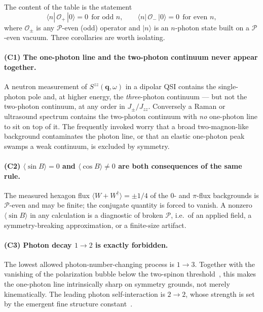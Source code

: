 \documentclass[aps,prl,preprint,amsmath,amssymb,superscriptaddress,
longbibliography,floatfix]{revtex4-2}
\newcommand{\Jzz}{J_{zz}}
\newcommand{\Jpm}{J_{\pm}}
\DeclareRobustCommand{\bq}{\bm q}
\newcommand{\PP}{\mathcal{P}}
\begin{document}
The content of the table is the statement
\begin{equation}
 \langle n|\,\mathcal O_+\,|0\rangle=0 \ \ \text{for odd } n,
 \qquad
 \langle n|\,\mathcal O_-\,|0\rangle=0 \ \ \text{for even } n,
 \label{eq:rule}
\end{equation}
where $\mathcal O_\pm$ is any $\PP$-even (odd) operator and $|n\rangle$ is an
$n$-photon state built on a $\PP$-even vacuum.  Three corollaries are worth
isolating.

\paragraph{(C1) The one-photon line and the two-photon continuum never appear
together.}  A neutron measurement of $S^{zz}(\bq,\omega)$ in a dipolar QSI
contains the single-photon pole and, at higher energy, the \emph{three}-photon
continuum --- but not the two-photon continuum, at any order in $\Jpm/\Jzz$.
Conversely a Raman or ultrasound spectrum contains the two-photon continuum
with \emph{no} one-photon line to sit on top of it.  The frequently invoked
worry that a broad two-magnon-like background contaminates the photon line, or
that an elastic one-photon peak swamps a weak continuum, is excluded by
symmetry.

\paragraph{(C2) $\langle\sin B\rangle=0$ and $\langle\cos B\rangle\neq0$ are
both consequences of the same rule.}  The measured hexagon flux
$\langle W+W^\dagger\rangle=\pm1/4$ of the $0$- and $\pi$-flux backgrounds is
$\PP$-even and may be finite; the conjugate quantity is forced to vanish.  A
nonzero $\langle\sin B\rangle$ in any calculation is a diagnostic of broken
$\PP$, i.e.\ of an applied field, a symmetry-breaking approximation, or a
finite-size artifact.

\paragraph{(C3) Photon decay $1\to2$ is exactly forbidden.}  The lowest
allowed photon-number-changing process is $1\to3$.  Together with the vanishing
of the polarization bubble below the two-spinon
threshold~\cite{Savary2012}, this makes the one-photon line intrinsically
sharp on symmetry grounds, not merely kinematically.  The leading photon
self-interaction is $2\to2$, whose strength is set by the emergent fine
structure constant~\cite{Pace2021}.
\end{document}
